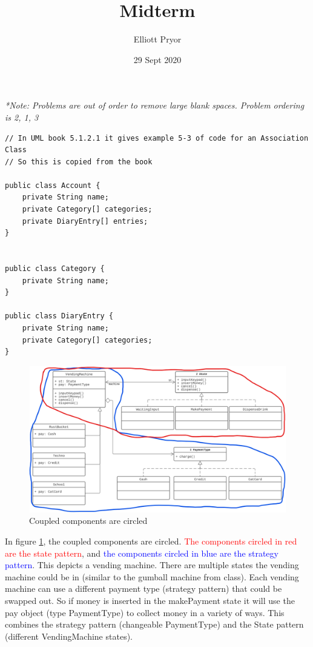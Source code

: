 \documentclass[11pt]{article}
\title{Midterm}
\author{Elliott Pryor}
\date{29 Sept 2020}
\begin{document}
\maketitle

\begin{huge}
\textit{*Note: Problems are out of order to remove large blank spaces. Problem ordering is 2, 1, 3}
\end{huge}


\begin{Verbatim}
// In UML book 5.1.2.1 it gives example 5-3 of code for an Association Class
// So this is copied from the book

public class Account {
    private String name;
    private Category[] categories;
    private DiaryEntry[] entries;
}


public class Category {
    private String name;
}

public class DiaryEntry {
    private String name;
    private Category[] categories;
}
\end{Verbatim}






\begin{figure}[H]
    \centering
    \includegraphics[scale=0.5]{./coupled_q3.png}
    \caption{Coupled components are circled}
    \label{fig:circled}
\end{figure}

In figure \ref{fig:circled}, the coupled components are circled. \textcolor{red}{The components circled in red are the state pattern}, and \textcolor{blue}{the components circled in blue are the strategy pattern}. This depicts a vending machine. There are multiple states the vending machine could be in (similar to the gumball machine from class). Each vending machine can use a different payment type (strategy pattern) that could be swapped out. So if money is inserted in the makePayment state it will use the pay object (type PaymentType) to collect money in a variety of ways. This combines the strategy pattern (changeable PaymentType) and the State pattern (different VendingMachine states). 


\end{document}
